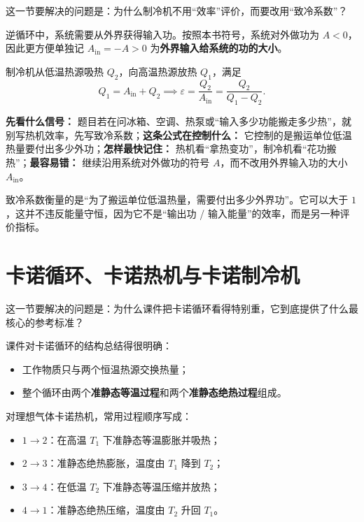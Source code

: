 \documentclass[lang=cn,11pt]{elegantbook}
\begin{document}
这一节要解决的问题是：为什么制冷机不用“效率”评价，而要改用“致冷系数”？

逆循环中，系统需要从外界获得输入功。按照本书符号，系统对外做功为 \(A<0\)，因此更方便单独记 \(A_{\text{in}}=-A>0\) 为\textbf{外界输入给系统的功的大小}。

制冷机从低温热源吸热 \(Q_2\)，向高温热源放热 \(Q_1\)，满足
\[
Q_1=A_{\text{in}}+Q_2
\implies \varepsilon=\frac{Q_2}{A_{\text{in}}}=\frac{Q_2}{Q_1-Q_2}.
\]

\begin{note}
\textbf{先看什么信号：} 题目若在问冰箱、空调、热泵或“输入多少功能搬走多少热”，就别写热机效率，先写致冷系数；\textbf{这条公式在控制什么：} 它控制的是搬运单位低温热量要付出多少外功；\textbf{怎样最快记住：} 热机看“拿热变功”，制冷机看“花功搬热”；\textbf{最容易错：} 继续沿用系统对外做功的符号 \(A\)，而不改用外界输入功的大小 \(A_{\text{in}}\)。
\end{note}

\begin{remark}
致冷系数衡量的是“为了搬运单位低温热量，需要付出多少外界功”。它可以大于 \(1\)，这并不违反能量守恒，因为它不是“输出功 / 输入能量”的效率，而是另一种评价指标。
\end{remark}

\section{卡诺循环、卡诺热机与卡诺制冷机}

这一节要解决的问题是：为什么课件把卡诺循环看得特别重，它到底提供了什么最核心的参考标准？

课件对卡诺循环的结构总结得很明确：
\begin{itemize}
  \item 工作物质只与两个恒温热源交换热量；
  \item 整个循环由两个\textbf{准静态等温过程}和两个\textbf{准静态绝热过程}组成。
\end{itemize}

对理想气体卡诺热机，常用过程顺序写成：
\begin{itemize}
  \item \(1\to2\)：在高温 \(T_1\) 下准静态等温膨胀并吸热；
  \item \(2\to3\)：准静态绝热膨胀，温度由 \(T_1\) 降到 \(T_2\)；
  \item \(3\to4\)：在低温 \(T_2\) 下准静态等温压缩并放热；
  \item \(4\to1\)：准静态绝热压缩，温度由 \(T_2\) 升回 \(T_1\)。
\end{itemize}
\end{document}
